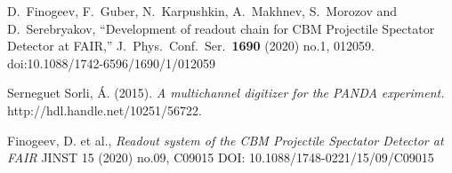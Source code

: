 \documentclass{CBM-PR-2020}
\begin{document}
\begin{thebibliography}{9}   %
  D.~Finogeev, F.~Guber, N.~Karpushkin, A.~Makhnev, S.~Morozov and D.~Serebryakov,
  ``Development of readout chain for CBM Projectile Spectator Detector at FAIR,''
  J.\ Phys.\ Conf.\ Ser.\  {\bf 1690} (2020) no.1,  012059.
  doi:10.1088/1742-6596/1690/1/012059
  
Serneguet Sorli, Á. (2015). \emph{A multichannel digitizer for the PANDA experiment.} http://hdl.handle.net/10251/56722.

Finogeev, D. et al., \emph{Readout system of the CBM Projectile Spectator                       Detector at FAIR} JINST 15 (2020) no.09, C09015
DOI: 10.1088/1748-0221/15/09/C09015


\end{thebibliography}
\end{document}
